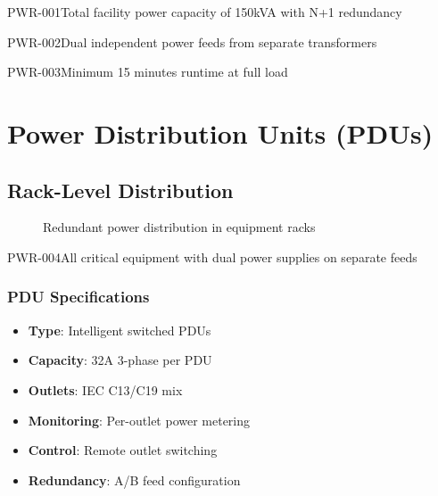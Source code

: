 \begin{requirement}{PWR-001}{Total facility power capacity of 150kVA with N+1 redundancy}
\begin{requirement}{PWR-002}{Dual independent power feeds from separate transformers}
\begin{requirement}{PWR-003}{Minimum 15 minutes runtime at full load}
\section{Power Distribution Units (PDUs)}

\subsection{Rack-Level Distribution}

\begin{figure}[H]
\centering
{}
\caption{Redundant power distribution in equipment racks}
\end{figure}

\begin{requirement}{PWR-004}{All critical equipment with dual power supplies on separate feeds}

\subsubsection{PDU Specifications}
\begin{itemize}
    \item \textbf{Type}: Intelligent switched PDUs
    \item \textbf{Capacity}: 32A 3-phase per PDU
    \item \textbf{Outlets}: IEC C13/C19 mix
    \item \textbf{Monitoring}: Per-outlet power metering
    \item \textbf{Control}: Remote outlet switching
    \item \textbf{Redundancy}: A/B feed configuration
\end{itemize}


\end{requirement}
\end{requirement}
\end{requirement}
\end{requirement}
